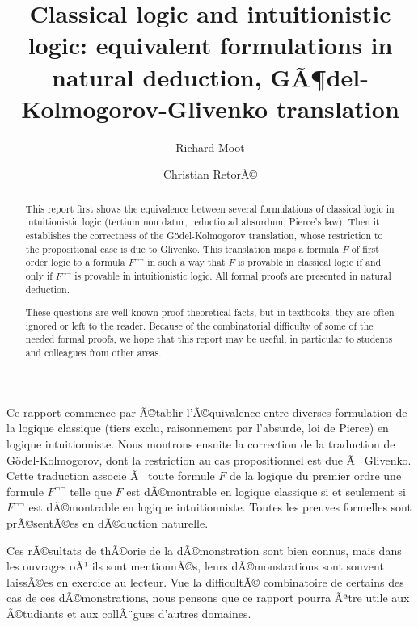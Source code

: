 \documentclass[english]{smfart}
\author{Richard Moot}
\author{Christian RetorÃ©}
\title[Classical logic and intuitionistic logic]{Classical logic and intuitionistic logic: equivalent formulations in natural deduction,  
GÃ¶del-Kolmogorov-Glivenko translation}
\theoremstyle{plain}
\begin{document}
 

\frontmatter
\begin{abstract}
This report first shows the equivalence between several
  formulations of classical logic in intuitionistic logic (tertium non datur, reductio ad absurdum, Pierce's law). 
Then it establishes the correctness of the G\"odel-Kolmogorov translation, whose restriction to the propositional case is due to  Glivenko.  This translation maps a formula $F$ of first order logic to a formula $F^{\lnot\lnot}$ in such a way that $F$ is provable in classical logic if and only if $F^{\lnot\lnot}$ is provable in intuitionistic logic. All formal proofs are presented in natural deduction. 

These questions are well-known proof theoretical  facts, but in textbooks, they are often ignored or left to the reader. 
Because of the combinatorial difficulty of some of the  needed formal proofs, we hope that this report may be useful, in particular to students and colleagues from other areas. \end{abstract}
\begin{altabstract}
Ce rapport commence par Ã©tablir l'Ã©quivalence entre diverses formulation de la logique classique (tiers exclu, raisonnement par l'absurde, loi de Pierce) en logique intuitionniste. Nous  montrons ensuite la correction de la traduction de G\"odel-Kolmogorov, dont la restriction au cas propositionnel est due Ã  Glivenko.  Cette traduction associe Ã  toute formule $F$ de la logique du premier ordre une formule $F^{\lnot\lnot}$ 
telle que $F$ est dÃ©montrable en logique classique si et seulement si $F^{\lnot\lnot}$  est dÃ©montrable en logique intuitionniste. Toutes les preuves formelles sont prÃ©sentÃ©es en dÃ©duction naturelle. 

Ces rÃ©sultats de thÃ©orie de la dÃ©monstration sont bien connus, mais dans les ouvrages oÃ¹ ils sont mentionnÃ©s, leurs dÃ©monstrations sont souvent laissÃ©es en exercice au lecteur. Vue la difficultÃ© combinatoire de certains des cas  de ces dÃ©monstrations, nous pensons que ce rapport pourra Ãªtre utile aux Ã©tudiants et aux collÃ¨gues d'autres domaines. 
\end{altabstract}

\maketitle
\end{document}
